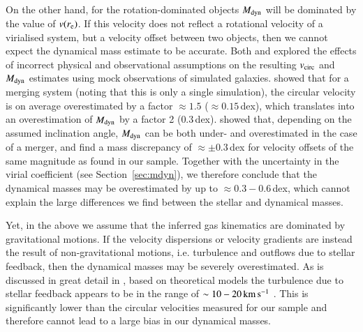 \documentclass[longauth]{aa}
\newcommand{\kms}{\rm km\,s^{-1}}
\newcommand{\re}{r_{\rm e}}
\newcommand{\vc}{v_{\rm circ}}
\newcommand{\Mdyn}{M_{\rm dyn}}
\begin{document}
On the other hand, for the rotation-dominated objects $\Mdyn$ will be dominated by the value of $v(\re)$. If this velocity does not reflect a rotational velocity of a virialised system, but a velocity offset between two objects, then we cannot expect the dynamical mass estimate to be accurate. Both \citet{Simons2019} and \citet{Kohandel2019} explored the effects of incorrect physical and observational assumptions on the resulting $\vc$ and $\Mdyn$ estimates using mock observations of simulated galaxies. \citet{Simons2019} showed that for a merging system (noting that this is only a single simulation), the circular velocity is on average overestimated by a factor $\approx 1.5$ ($\approx 0.15\,$dex), which translates into an overestimation of $\Mdyn$ by a factor 2 ($0.3\,$dex). \citet{Kohandel2019} showed that, depending on the assumed inclination angle, $\Mdyn$ can be both under- and overestimated in the case of a merger, and find a mass discrepancy of $\approx \pm0.3\,$dex for velocity offsets of the same magnitude as found in our sample. Together with the uncertainty in the virial coefficient (see Section~\ref{sec:mdyn}), we therefore conclude that the dynamical masses may be overestimated by up to $\approx 0.3-0.6\,$dex, which cannot explain the large differences we find between the stellar and dynamical masses.

Yet, in the above we assume that the inferred gas kinematics are dominated by gravitational motions. If the velocity dispersions or velocity gradients are instead the result of non-gravitational motions, i.e. turbulence and outflows due to stellar feedback, then the dynamical masses may be severely overestimated. 
As is discussed in great detail in \citet{Uebler2019}, based on theoretical models the turbulence due to stellar feedback appears to be in the range of $\sim 10-20\,\kms$ \citep{Ostriker2011,Shetty2012,Krumholz2018}. This is significantly lower than the circular velocities measured for our sample and therefore cannot lead to a large bias in our dynamical masses. 
\end{document}
